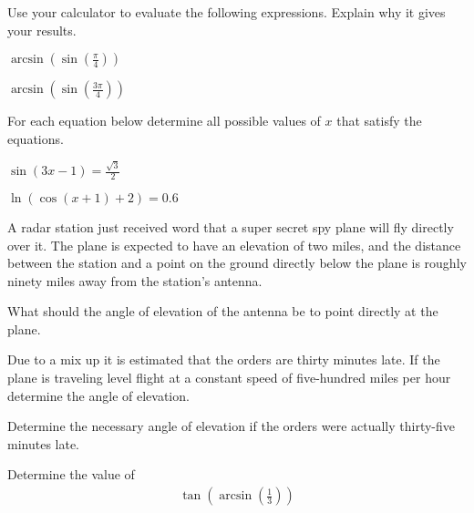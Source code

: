 \begin{problem}
\item Use your calculator to evaluate the following
  expressions. Explain why it gives your results.
  \begin{subproblem}
    \item $\arcsin\left(\sin\left(\frac{\pi}{4}\right)\right)$
      \vfill
    \item $\arcsin\left(\sin\left(\frac{3\pi}{4}\right)\right)$
      \vfill
  \end{subproblem}

  \clearpage

  \item For each equation below determine all possible values of $x$
    that satisfy the equations.
    \begin{subproblem}
      \item ${\displaystyle \sin(3x-1)=\frac{\sqrt{3}}{2}}$
        \vfill
      \item ${\displaystyle \ln(\cos(x+1)+2)=0.6}$
        \vfill
    \end{subproblem}

  \clearpage

\item A radar station just received word that a super secret spy plane
  will fly directly over it. The plane is expected to have an elevation of
  two miles, and the distance between the station and a point on the ground
  directly below the plane is roughly ninety miles away from the station's antenna.
  \begin{subproblem}
  \item What should the angle of elevation of the antenna be to point directly
    at the plane.
    \vfill
  \item Due to a mix up it is estimated that the orders are thirty minutes late.
    If the plane is traveling level flight at a constant speed of
    five-hundred miles per hour determine the angle of elevation.
    \vfill
  \item Determine the necessary angle of elevation if the orders were actually
    thirty-five minutes late.
    \vfill
  \end{subproblem}

  \vfill

  \clearpage

\item Determine the value of
  \begin{eqnarray*}
    \tan\left(\arcsin\left(\frac{1}{3}\right)\right)
  \end{eqnarray*}


\end{problem}
